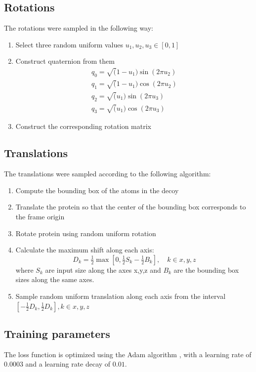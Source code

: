 \documentclass[letter,10pt]{article}
\begin{document}
\subsection*{Rotations}
The rotations were sampled in the following way:
\begin{enumerate}
\item Select three random uniform values $u_1, u_2, u_3 \in [0,1]$
\item Construct quaternion from them
\begin{eqnarray}
q_0 = \sqrt(1-u_1) \sin(2\pi  u_2) \\
q_1 = \sqrt(1-u_1) \cos(2\pi  u_2) \\
q_2 = \sqrt(u_1) \sin(2\pi  u_3) \\
q_3 = \sqrt(u_1) \cos(2\pi  u_3) 
\end{eqnarray}
\item Construct the corresponding rotation matrix
\end{enumerate}

\subsection*{Translations}
The translations were sampled according to the following algorithm:
\begin{enumerate}
\item Compute the bounding box of the atoms in the decoy
\item Translate the protein so that the center of the bounding box corresponds to the frame origin 
\item Rotate protein using random uniform rotation
\item Calculate the maximum shift along each axis:
$$
D_k = \tfrac{1}{2}\max\left[ 0, \tfrac{1}{2}S_k - \tfrac{1}{2}B_k \right], \quad k \in {x, y, z}
$$
where $S_k$ are input size along the axes x,y,z and $B_k$ are the bounding box sizes along the same axes.

\item Sample random uniform translation along each axis from the
  interval $[-\tfrac{1}{2}D_k, \tfrac{1}{2}D_k], k \in {x,y,z}$
\end{enumerate}

\subsection*{Training parameters}

The loss function is optimized using the Adam algorithm \cite{kingma2014adam},
with a learning rate of $0.0003$ and a learning rate decay of $0.01$.
\end{document}
